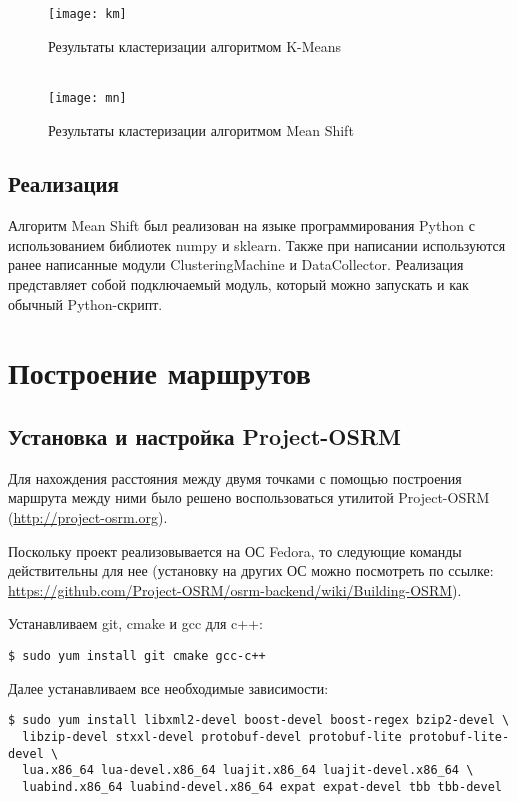 \begin{figure}[hp!]
    \center
    \texttt{[image: km]}\\
    \parbox{1.0\textwidth}{\centering\caption{Результаты кластеризации алгоритмом K-Means}}\\
    \texttt{[image: mn]}\\
    \parbox{1.0\textwidth}{\centering\caption{Результаты кластеризации алгоритмом Mean Shift}}
\end{figure}

\section{Реализация}
Алгоритм Mean Shift был реализован на языке программирования Python с использованием
библиотек numpy и sklearn. Также при написании ис\-поль\-зуют\-ся ранее написанные модули
ClusteringMachine и DataCollector. Реали\-за\-ция пред\-став\-ляет собой подключаемый модуль,
который можно запускать и как обыч\-ный Python-скрипт.





\chapter{Построение маршрутов}
\section{Установка и настройка Project-OSRM}
Для нахождения расстояния между двумя точками с помощью построения маршрута между ними было решено
воспользоваться утилитой Project-OSRM (\url{http://project-osrm.org}).

Поскольку проект реализовывается на ОС Fedora, то следующие команды действительны для нее
(установку на других ОС можно посмотреть по ссылке:
\url{https://github.com/Project-OSRM/osrm-backend/wiki/Building-OSRM}).

Устанавливаем git, cmake и gcc для c++:
\begin{lstlisting}
$ sudo yum install git cmake gcc-c++
\end{lstlisting}

Далее устанавливаем все необходимые зависимости:
\begin{lstlisting}
$ sudo yum install libxml2-devel boost-devel boost-regex bzip2-devel \
  libzip-devel stxxl-devel protobuf-devel protobuf-lite protobuf-lite-devel \
  lua.x86_64 lua-devel.x86_64 luajit.x86_64 luajit-devel.x86_64 \
  luabind.x86_64 luabind-devel.x86_64 expat expat-devel tbb tbb-devel
\end{lstlisting}

